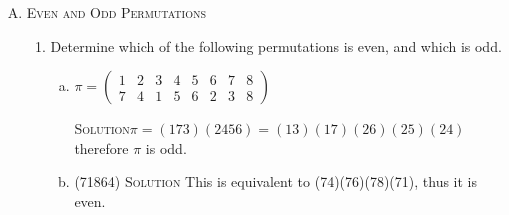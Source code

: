 \documentclass[twoside]{amsart}
\newcommand{\solution}{\textsc{Solution}\xspace}
\begin{document}
\begin{enumerate}[A.]
\begin{enumerate}[1]
      \noindent \solution Proceed as in part 6. We know that
      $a_i$ is taken to $a_j$ where $j=i+k$ module $s$. Therefore
      we will have $k$ cycles: $(a_1 a_{1+k} \dots a_{s-k+1})$,
      $(a_2 a_{2+k} \dots a_{s-k+2})$, $\ldots$, 
      $(a_k a_{k+k} \dots a_s)$.

      \item If $s$ is a prime number, every power of $\alpha$ is a cycle.

      \noindent \solution Let's assume that there exists an $n$ such that
      when $s$ is prime $\alpha^n$ is the product of $m$ distinct cycles.
      Then the cycles would look like

      \begin{tabular}{c}
      $(a_1 a_{1+n} a_{1+2n} \dots a_{s-2n+1} a_{s-n+1})$ \\
      $(a_2 a_{2+n} a_{2+2n} \dots a_{s-2n+2} a_{s-n+2})$ \\
      $\vdots$ \\
      $(a_m a_{m+n} a_{m+2n} \dots a_{s-2n+m} a_{s-n+m})$
      \end{tabular}

      And we would end up with $m$ cycles each of length $s/m$. But
      this contradicts are assumption that $s$ is prime and therefore
      not divisible by $m$. Therefore $m$ must be 1.

   \end{enumerate}

   \item \textsc{Even and Odd Permutations}

   \begin{enumerate}[1]
       \item Determine which of the following permutations is even, and
       which is odd.

       \begin{enumerate}[(a)]
          \item $\pi = \begin{pmatrix}
	                  1 & 2 & 3 & 4 & 5 & 6 & 7 & 8 \\
			  7 & 4 & 1 & 5 & 6 & 2 & 3 & 8
	               \end{pmatrix}$

	  \noindent \solution $\pi = (173)(2456) = (13)(17)(26)(25)(24)$
	  therefore $\pi$ is odd.

	  \item (71864) \solution This is equivalent to (74)(76)(78)(71), thus
	  it is even.


\end{enumerate}
\end{enumerate}
\end{enumerate}
\end{document}

